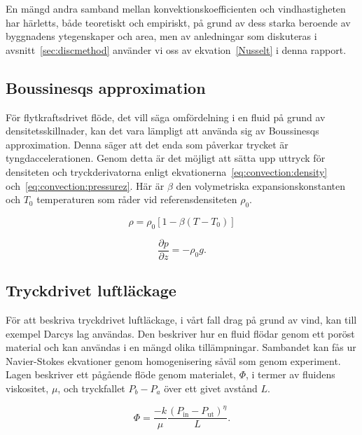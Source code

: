 En mängd andra samband mellan konvektionskoefficienten och vindhastigheten har härletts, både teoretiskt och empiriskt, på grund av dess starka beroende av byggnadens ytegenskaper och area, men av anledningar som diskuteras i avsnitt~\ref{sec:discmethod} använder vi oss av ekvation~\ref{Nusselt} i denna rapport.\cite{palyvos08}


\subsection{Boussinesqs approximation}
För flytkraftsdrivet flöde, det vill säga omfördelning i en fluid på grund av densitetsskillnader, kan det vara lämpligt att använda sig av
Boussinesqs app\-roximation. Denna säger att det enda som påverkar trycket är
tyngdaccelerationen. Genom detta är det möjligt att sätta upp uttryck för densiteten
och tryckderivatorna enligt ekvationerna~\eqref{eq:convection:density}
och~\eqref{eq:convection:pressurez}. Här är
$\beta$ den volymetriska expansionskonstanten och
$T_0$ temperaturen som råder vid referensdensiteten $\rho_0$.

\begin{equation}
\label{eq:convection:density}
\rho = \rho_0[1-\beta(T-T_0)]
\end{equation}

\begin{equation}
\label{eq:convection:pressurez}
\frac{\partial p}{\partial z} = -\rho_0g.
\end{equation}

\subsection{Tryckdrivet luftläckage}
\label{subsec:darcy}

För att beskriva tryckdrivet luftläckage, i vårt fall drag på grund av vind, kan till exempel Darcys lag användas. Den beskriver hur en fluid flödar genom ett poröst material och kan användas i en mängd olika tillämpningar. Sambandet kan fås ur Navier-Stokes ekvationer genom homogenisering såväl som genom experiment. Lagen beskriver ett pågående flöde genom materialet, $\Phi$, i termer av fluidens viskositet, $\mu$, och tryckfallet $P_b - P_a$ över ett givet avstånd $L$.

\begin{equation}
\Phi=\frac{-k}{\mu} \frac{(P_\text{in} - P_\text{ut})^\eta}{L}.
\end{equation}
    

